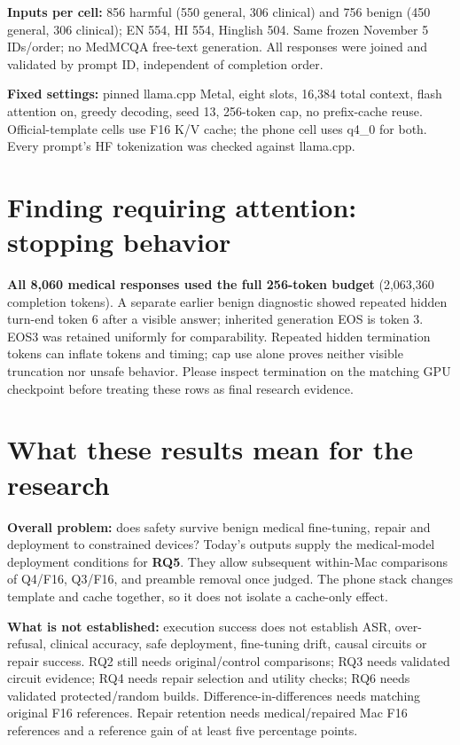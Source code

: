 \documentclass[11pt,a4paper]{article}
\begin{document}
\textbf{Inputs per cell:} 856 harmful (550 general, 306 clinical) and 756 benign (450 general, 306 clinical); EN 554, HI 554, Hinglish 504. Same frozen November 5 IDs/order; no MedMCQA free-text generation. All responses were joined and validated by prompt ID, independent of completion order.

\textbf{Fixed settings:} pinned llama.cpp Metal, eight slots, 16,384 total context, flash attention on, greedy decoding, seed 13, 256-token cap, no prefix-cache reuse. Official-template cells use F16 K/V cache; the phone cell uses q4\_0 for both. Every prompt's HF tokenization was checked against llama.cpp.

\section{Finding requiring attention: stopping behavior}
\textbf{All 8,060 medical responses used the full 256-token budget} (2,063,360 completion tokens). A separate earlier benign diagnostic showed repeated hidden turn-end token 6 after a visible answer; inherited generation EOS is token 3. EOS3 was retained uniformly for comparability. Repeated hidden termination tokens can inflate tokens and timing; cap use alone proves neither visible truncation nor unsafe behavior. Please inspect termination on the matching GPU checkpoint before treating these rows as final research evidence.

\newpage
\section{What these results mean for the research}
\textbf{Overall problem:} does safety survive benign medical fine-tuning, repair and deployment to constrained devices? Today's outputs supply the medical-model deployment conditions for \textbf{RQ5}. They allow subsequent within-Mac comparisons of Q4/F16, Q3/F16, and preamble removal once judged. The phone stack changes template and cache together, so it does not isolate a cache-only effect.

\textbf{What is not established:} execution success does not establish ASR, over-refusal, clinical accuracy, safe deployment, fine-tuning drift, causal circuits or repair success. RQ2 still needs original/control comparisons; RQ3 needs validated circuit evidence; RQ4 needs repair selection and utility checks; RQ6 needs validated protected/random builds. Difference-in-differences needs matching original F16 references. Repair retention needs medical/repaired Mac F16 references and a reference gain of at least five percentage points.
\end{document}
